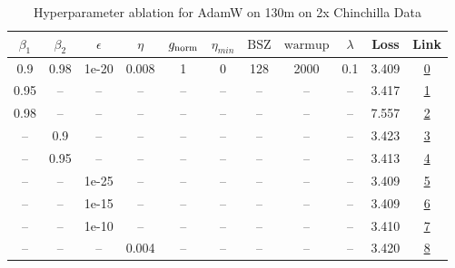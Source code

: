 \begin{table}[H]
\centering
\caption{Hyperparameter ablation for AdamW on 130m on 2x Chinchilla Data}
\label{tab:ablation_adamw_130m_on_2x_chinchilla_data}
\begin{tabular}{ccccccccccc}
\toprule
$\beta_1$ & $\beta_2$ & $\epsilon$ & $\eta$ & $g_{\mathrm{norm}}$ & $\eta_{min}$ & $\mathrm{BSZ}$ & $\mathrm{warmup}$ & $\lambda$ & Loss & Link \\
\midrule
0.9 & 0.98 & 1e-20 & 0.008 & 1 & 0 & 128 & 2000 & 0.1 & 3.409 & \href{https://wandb.ai/marin-community/optimizer-scaling/runs/sweep-130m-5B-adamw90f5c1lr0.008-wd0.1-minlr0-warmup2000-b10.9-b-67adb6}{0} \\
\midrule
0.95 & -- & -- & -- & -- & -- & -- & -- & -- & 3.417 & \href{https://wandb.ai/marin-community/optimizer-scaling/runs/sweep-130m-5B-adamw995582lr0.008-wd0.1-minlr0-warmup2000-b10.95--0fb321}{1} \\
0.98 & -- & -- & -- & -- & -- & -- & -- & -- & 7.557 & \href{https://wandb.ai/marin-community/optimizer-scaling/runs/sweep-130m-5B-adamw220e11lr0.008-wd0.1-minlr0-warmup2000-b10.98--f8f851}{2} \\
-- & 0.9 & -- & -- & -- & -- & -- & -- & -- & 3.423 & \href{https://wandb.ai/marin-community/optimizer-scaling/runs/sweep-130m-5B-adamw757bfblr0.008-wd0.1-minlr0-warmup2000-b10.9-b-da391a}{3} \\
-- & 0.95 & -- & -- & -- & -- & -- & -- & -- & 3.413 & \href{https://wandb.ai/marin-community/optimizer-scaling/runs/sweep-130m-5B-adamwc562dclr0.008-wd0.1-minlr0-warmup2000-b10.9-b-9752b5}{4} \\
-- & -- & 1e-25 & -- & -- & -- & -- & -- & -- & 3.409 & \href{https://wandb.ai/marin-community/optimizer-scaling/runs/sweep-130m-5B-adamw0da527lr0.008-wd0.1-minlr0-warmup2000-b10.9-b-9c6463}{5} \\
-- & -- & 1e-15 & -- & -- & -- & -- & -- & -- & 3.409 & \href{https://wandb.ai/marin-community/optimizer-scaling/runs/sweep-130m-5B-adamw4f03a8lr0.008-wd0.1-minlr0-warmup2000-b10.9-b-c453b4}{6} \\
-- & -- & 1e-10 & -- & -- & -- & -- & -- & -- & 3.410 & \href{https://wandb.ai/marin-community/optimizer-scaling/runs/sweep-130m-5B-adamwf4cc20lr0.008-wd0.1-minlr0-warmup2000-b10.9-b-c52587}{7} \\
-- & -- & -- & 0.004 & -- & -- & -- & -- & -- & 3.420 & \href{https://wandb.ai/marin-community/optimizer-scaling/runs/sweep-130m-5B-adamw8cf61clr0.004-wd0.1-minlr0-warmup2000-b10.9-b-481a17}{8} \\

\end{tabular}
\end{table}
